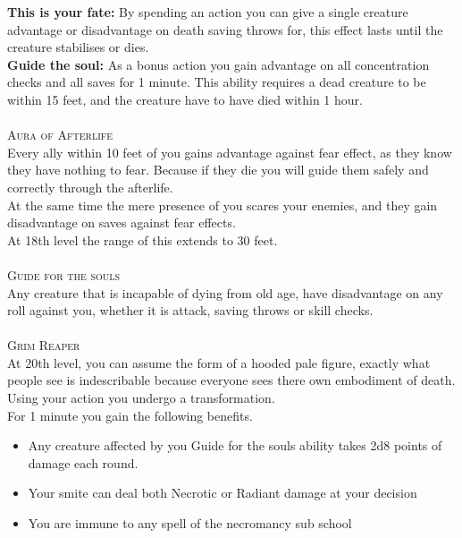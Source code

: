 \documentclass[22pt,a4paper,twocolumn]{article}
\begin{document}
\indent\textbf{This is your fate: }
By spending an action you can give a single creature advantage or disadvantage on death saving throws for, this effect lasts until the creature stabilises or dies.\\
\indent\textbf{Guide the soul: }As a bonus action you gain advantage on all concentration checks and all saves for 1 minute. This ability requires a dead creature to be within 15 feet, and the creature have to have died within 1 hour.\\\vspace{2cm}
\\
{\fontsize{18pt}{18pt}\textsc{\textcolor{title}{Aura of Afterlife}}}\\
Every ally within 10 feet of you gains advantage against fear effect, as they know they have nothing to fear. Because if they die you will guide them safely and correctly through the afterlife.\\
At the same time the mere presence of you scares your enemies, and they gain disadvantage on saves against fear effects.\\
\indent At 18th level the range of this extends to 30 feet.\\
\\
{\fontsize{18pt}{18pt}\textsc{\textcolor{title}{Guide for the souls}}}\\
Any creature that is incapable of dying from old age, have disadvantage on any roll against you, whether it is attack, saving throws or skill checks.\\
\\
{\fontsize{18pt}{18pt}\textsc{\textcolor{title}{Grim Reaper}}}\\
At 20th level, you can assume the form of a hooded pale figure, exactly what people see is indescribable because everyone sees there own embodiment of death.\\
\indent Using your action you undergo a transformation.\\
For 1 minute you gain the following benefits.
\begin{itemize}
\item Any creature affected by you Guide for the souls ability takes 2d8 points of damage each round.
\item Your smite can deal both Necrotic or Radiant damage at your decision
\item You are immune to any spell of the necromancy sub school
\end{itemize}
\end{document}
